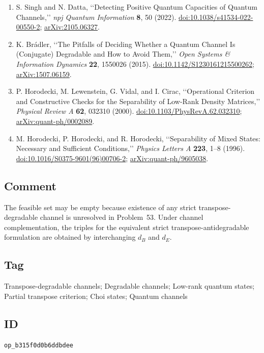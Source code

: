 \begin{enumerate}[label={},leftmargin=4.8em,labelsep=0.5em]
  \footnotesize
  \item[\textup{[SD22]}]\label{ref:p54-singh-datta}
  S. Singh and N. Datta,
  \lq\lq Detecting Positive Quantum Capacities of Quantum Channels,\rq\rq{}
  \emph{npj Quantum Information} \textbf{8}, 50 (2022).
  \href{https://doi.org/10.1038/s41534-022-00550-2}%
       {doi:10.1038/s41534-022-00550-2};
  \href{https://arxiv.org/abs/2105.06327}{arXiv:2105.06327}.

  \item[\textup{[Bra15]}]\label{ref:p54-bradler}
  K. Br{\'a}dler,
  \lq\lq The Pitfalls of Deciding Whether a Quantum Channel Is (Conjugate)
  Degradable and How to Avoid Them,\rq\rq{}
  \emph{Open Systems \& Information Dynamics} \textbf{22}, 1550026 (2015).
  \href{https://doi.org/10.1142/S1230161215500262}%
       {doi:10.1142/S1230161215500262};
  \href{https://arxiv.org/abs/1507.06159}{arXiv:1507.06159}.

  \item[\textup{[HLVC00]}]\label{ref:p54-horodecki-low-rank}
  P. Horodecki, M. Lewenstein, G. Vidal, and I. Cirac,
  \lq\lq Operational Criterion and Constructive Checks for the Separability of
  Low-Rank Density Matrices,\rq\rq{} \emph{Physical Review A} \textbf{62},
  032310 (2000).
  \href{https://doi.org/10.1103/PhysRevA.62.032310}%
       {doi:10.1103/PhysRevA.62.032310};
  \href{https://arxiv.org/abs/quant-ph/0002089}{arXiv:quant-ph/0002089}.

  \item[\textup{[HHH96]}]\label{ref:p54-horodecki-ppt}
  M. Horodecki, P. Horodecki, and R. Horodecki,
  \lq\lq Separability of Mixed States: Necessary and Sufficient
  Conditions,\rq\rq{} \emph{Physics Letters A} \textbf{223}, 1--8 (1996).
  \href{https://doi.org/10.1016/S0375-9601(96)00706-2}%
       {doi:10.1016/S0375-9601(96)00706-2};
  \href{https://arxiv.org/abs/quant-ph/9605038}{arXiv:quant-ph/9605038}.
\end{enumerate}

\subsection*{Comment}

The feasible set may be empty because existence of any strict
transpose-degradable channel is unresolved in Problem~53.  Under channel
complementation, the triples for the equivalent strict
transpose-antidegradable formulation are obtained by interchanging $d_B$ and
$d_E$.

\subsection*{Tag}

Transpose-degradable channels; Degradable channels; Low-rank quantum states;
Partial transpose criterion; Choi states; Quantum channels

\subsection*{ID}

\texttt{op\_b315f0d0b6ddbdee}
